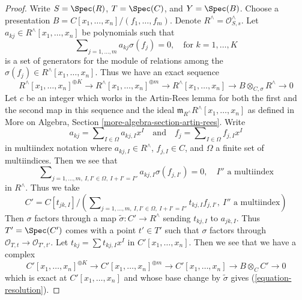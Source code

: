 \begin{proof}
\medskip\noindent
Write $S = \Spec(R)$, $T = \Spec(C)$, and $Y = \Spec(B)$.
Choose a presentation $B = C[x_1, \ldots, x_n]/(f_1, \ldots, f_m)$.
Denote $R^\wedge = \mathcal{O}_{S, s}^\wedge$.
Let $a_{kj} \in R^\wedge[x_1, \ldots, x_n]$ be polynomials
such that
$$
\sum\nolimits_{j = 1, \ldots, m} a_{kj}\sigma(f_j) = 0,\quad
\text{for }k = 1, \ldots, K
$$
is a set of generators for the module of relations among
the $\sigma(f_j) \in R^\wedge[x_1, \ldots, x_n]$.
Thus we have an exact sequence
\begin{equation}
\label{equation-resolution}
R^\wedge[x_1, \ldots, x_n]^{\oplus K} \to
R^\wedge[x_1, \ldots, x_n]^{\oplus m} \to
R^\wedge[x_1, \ldots, x_n] \to B \otimes_{C, \sigma} R^\wedge \to 0
\end{equation}
Let $c$ be an integer which works in the Artin-Rees lemma for
both the first and the second map in this sequence and the ideal
$\mathfrak m_{R^\wedge}R^\wedge[x_1, \ldots, x_n]$ as defined in
More on Algebra, Section \ref{more-algebra-section-artin-rees}.
Write
$$
a_{kj} = \sum\nolimits_{I \in \Omega} a_{kj, I} x^I
\quad\text{and}\quad
f_j = \sum\nolimits_{I \in \Omega} f_{j, I} x^I
$$
in multiindex notation where $a_{kj, I} \in R^\wedge$, $f_{j, I} \in C$,
and $\Omega$ a finite set of multiindices. Then we see that
$$
\sum\nolimits_{j = 1, \ldots, m,\ I, I' \in \Omega,\ I + I' = I''}
a_{kj, I} \sigma(f_{j, I'}) = 0,\quad
I''\text{ a multiindex}
$$
in $R^\wedge$. Thus we take
$$
C' = C[t_{jk, I}]/
\left(
\sum\nolimits_{j = 1, \ldots, m,\ I, I' \in \Omega,\ I + I' = I''}
t_{kj, I} f_{j, I'},\ I''\text{ a multiindex}\right)
$$
Then $\sigma$ factors through a map $\tilde\sigma : C' \to R^\wedge$
sending $t_{kj, I}$ to $a_{jk, I}$.
Thus $T' = \Spec(C')$ comes with a point $t' \in T'$ such that
$\sigma$ factors through $\mathcal{O}_{T, t} \to \mathcal{O}_{T', t'}$.
Let $t_{kj} = \sum t_{kj, I} x^I$ in $C'[x_1, \ldots, x_n]$.
Then we see that we have a complex
\begin{equation}
\label{equation-resolution-new}
C'[x_1, \ldots, x_n]^{\oplus K} \to
C'[x_1, \ldots, x_n]^{\oplus m} \to
C'[x_1, \ldots, x_n] \to B \otimes_C C' \to 0
\end{equation}
which is exact at $C'[x_1, \ldots, x_n]$ and whose base change
by $\tilde\sigma$ gives (\ref{equation-resolution}).


\end{proof}
